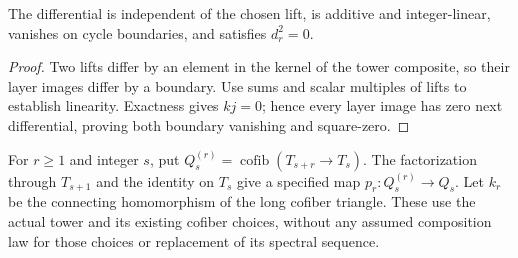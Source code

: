 \begin{proposition}
  \label{prop:h6-tower-differential-laws}
  \leanok
  The differential is independent of the chosen lift, is additive and
  integer-linear, vanishes on cycle boundaries, and satisfies $d_r^2=0$.
\end{proposition}
\begin{proof}
  Two lifts differ by an element in the kernel of the tower composite,
  so their layer images differ by a boundary. Use sums and scalar multiples
  of lifts to establish linearity. Exactness gives $kj=0$; hence every
  layer image has zero next differential, proving both boundary vanishing
  and square-zero.
  \leanok
\end{proof}

\begin{definition}
  \label{def:h6-tower-long-layer}
  \leanok
  For $r\ge1$ and integer $s$, put
  $Q_s^{(r)}=\operatorname{cofib}(T_{s+r}\to T_s)$.
  The factorization through $T_{s+1}$ and the identity on $T_s$ give a
  specified map $p_r:Q_s^{(r)}\to Q_s$. Let $k_r$ be the connecting
  homomorphism of the long cofiber triangle. These use the actual tower
  and its existing cofiber choices, without any assumed composition law
  for those choices or replacement of its spectral sequence.
\end{definition}

